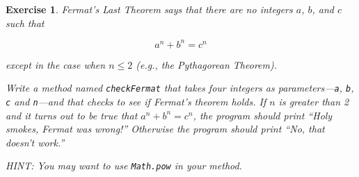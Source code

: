 \documentclass[12pt]{book}
\theoremstyle{exercise}
\newtheorem{exercise}{Exercise}[chapter]
\newcommand{\java}[1]{\lstinline{#1}} %
\begin{document}
\begin{exercise}
Fermat's Last Theorem says that there are no integers $a$, $b$, and $c$ such that

\[ a^n + b^n = c^n \]

except in the case when $n \leq 2$ (e.g., the Pythagorean Theorem).

Write a method named {\tt checkFermat} that takes four integers as parameters---{\tt a}, {\tt b}, {\tt c} and {\tt n}---and that checks to see if Fermat's theorem holds.
If $n$ is greater than 2 and it turns out to be true that $a^n + b^n = c^n$, the program should print ``Holy smokes, Fermat was wrong!''
Otherwise the program should print ``No, that doesn't work.''

HINT: You may want to use \java{Math.pow} in your method.
\end{exercise}
\end{document}
